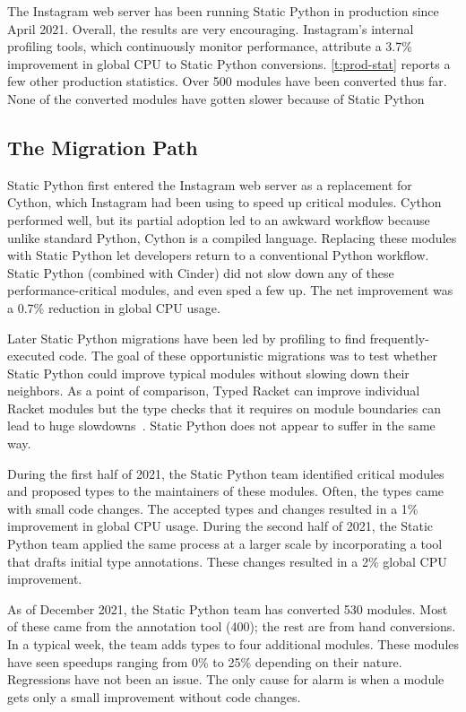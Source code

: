 \documentclass[english,cleveref,submission]{programming}
\newcommand{\SP}{Static Python}
\begin{document}
The Instagram web server has been running \SP{} in production since April 2021.
Overall, the results are very encouraging.
Instagram's internal profiling tools, which continuously monitor
performance, attribute a 3.7\% improvement in global CPU to \SP{} conversions.
\cref{t:prod-stat} reports a few other production statistics.
Over 500 modules have been converted thus far.
None of the converted modules have gotten slower because of \SP{}


\subsection{The Migration Path}

\SP{} first entered the Instagram web server as a replacement for Cython,
which Instagram had been using to speed up critical modules.
Cython performed well, but its partial adoption led to an awkward workflow
because unlike standard Python, Cython is a compiled language.
Replacing these modules with \SP{} let developers return to a conventional
Python workflow.
\SP{} (combined with Cinder) did not slow down any of these
performance-critical modules, and even sped a few up.
The net improvement was a 0.7\% reduction in global CPU usage.

Later \SP{} migrations have been led by profiling to find frequently-executed code.
The goal of these opportunistic migrations was to test whether \SP{} could
improve typical modules without slowing down their neighbors.
As a point of comparison, Typed Racket can improve individual Racket
modules but the type checks that it requires on module boundaries
can lead to huge slowdowns~\cite{tfgnvf-popl-2016,gtnffvf-jfp-2019}.
\SP{} does not appear to suffer in the same way.

During the first half of 2021, the \SP{} team identified critical
modules and proposed types to the maintainers of these modules.
Often, the types came with small code changes.
The accepted types and changes resulted in a 1\% improvement
in global CPU usage.
During the second half of 2021, the \SP{} team applied the same
process at a larger scale by incorporating a tool that drafts
initial type annotations.
These changes resulted in a 2\% global CPU improvement.

As of December 2021, the \SP{} team has converted 530 modules.
Most of these came from the annotation tool (400); the rest
are from hand conversions.
In a typical week, the team adds types to four additional modules.
These modules have seen speedups ranging from 0\% to 25\% depending
on their nature.
Regressions have not been an issue.
The only cause for alarm is when a module gets only a small improvement
without code changes.
\end{document}
